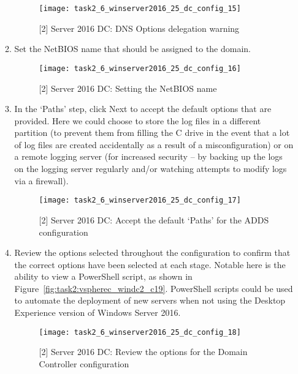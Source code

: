 \begin{enumerate}[series=task2methodology3]
\begin{enumerate}[label=(\alph*)]
        \begin{figure}[H]
          \centering
          \captionsetup{skip=2pt}
          \texttt{[image: task2\_6\_winserver2016\_25\_dc\_config\_15]}
          \caption{[2] Server 2016 DC: DNS Options delegation warning}
          \label{fig:task2:vspherec_windc2_c15}
        \end{figure}
      \item Set the NetBIOS name that should be assigned to the domain.
        \begin{figure}[H]
          \centering
          \captionsetup{skip=2pt}
          \texttt{[image: task2\_6\_winserver2016\_25\_dc\_config\_16]}
          \caption{[2] Server 2016 DC: Setting the NetBIOS name}
          \label{fig:task2:vspherec_windc2_c16}
        \end{figure}
      \item In the `Paths' step, click Next to accept the default options that are provided. Here we could choose to store the log files in a different partition (to prevent them from filling the C drive in the event that a lot of log files are created accidentally as a result of a misconfiguration) or on a remote logging server (for increased security -- by backing up the logs on the logging server regularly and/or watching attempts to modify logs via a firewall).
        \begin{figure}[H]
          \centering
          \captionsetup{skip=2pt}
          \texttt{[image: task2\_6\_winserver2016\_25\_dc\_config\_17]}
          \caption{[2] Server 2016 DC: Accept the default `Paths' for the ADDS configuration}
          \label{fig:task2:vspherec_windc2_c17}
        \end{figure}
      \item Review the options selected throughout the configuration to confirm that the correct options have been selected at each stage. Notable here is the ability to view a PowerShell script, as shown in Figure~\ref{fig:task2:vspherec_windc2_c19}. PowerShell scripts could be used to automate the deployment of new servers when not using the Desktop Experience version of Windows Server 2016.
        \begin{figure}[H]
          \centering
          \captionsetup{skip=2pt}
          \texttt{[image: task2\_6\_winserver2016\_25\_dc\_config\_18]}
          \caption{[2] Server 2016 DC: Review the options for the Domain Controller configuration}
          \label{fig:task2:vspherec_windc2_c18}
        \end{figure}

\end{enumerate}
\end{enumerate}
